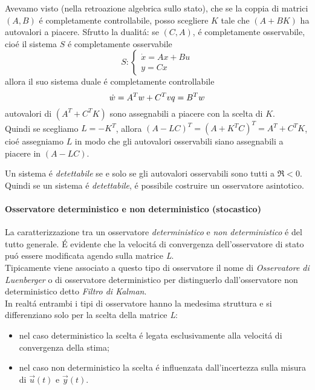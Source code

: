 \documentclass[../main.tex]{subfiles}
\begin{document}
		Avevamo visto (nella retroazione algebrica sullo stato), che se la coppia di matrici $ (A,B) $ \'e completamente controllabile, posso scegliere $ K $ tale che $ (A+BK) $ ha autovalori a piacere. Sfrutto la dualit\'a: se $ (C,A) $, \'e completamente osservabile, cio\'e il sistema $ S $ \'e completamente osservabile
		\[
			S:
			\begin{cases}
				\dot x = Ax + Bu\\
				y = Cx
			\end{cases}
		\]
		allora il suo sistema duale \'e completamente controllabile
		\[
			\dot w = A^T w + C^T v\\
			q = B^T w
		\]
		autovalori di $ (A^T + C^T K) $ sono assegnabili a piacere con la scelta di $ K $.\\
		Quindi se scegliamo $ L = -K^T $, allora $ (A-LC)^T = (A+K^TC)^T = A^T + C^TK $, cio\'e assegniamo $ L $ in modo che gli autovalori osservabili siano assegnabili a piacere in $ (A-LC) $.
		
		\begin{definition}
			Un sistema \'e \textit{detettabile} se e solo se gli autovalori osservabili sono tutti a $ \Re < 0 $. Quindi se un sistema \'e \textit{detettabile}, \'e possibile costruire un osservatore asintotico.
		\end{definition}
		
		\paragraph{Osservatore deterministico e non deterministico (stocastico)}
		La caratterizzazione tra un osservatore \textit{deterministico} e \textit{non deterministico} \'e del tutto generale. \'E evidente che la velocit\'a di convergenza dell'osservatore di stato pu\'o essere modificata agendo sulla matrice \textit{L}.\\
		Tipicamente viene associato a questo tipo di osservatore il nome di \textit{Osservatore di Luenberger} o di osservatore deterministico per distinguerlo dall'osservatore non deterministico detto \textit{Filtro di Kalman}.\\
		In realt\'a entrambi i tipi di osservatore hanno la medesima struttura e si differenziano solo per la scelta della matrice \textit{L}:
		\begin{itemize}
			\item nel caso deterministico la scelta \'e legata esclusivamente alla velocit\'a di convergenza della stima;
			\item nel caso non deterministico la scelta \'e influenzata dall'incertezza sulla misura di ${\vec {u}}(t)$ e ${\vec {y}}(t)$.
		\end{itemize}
		
\end{document}
